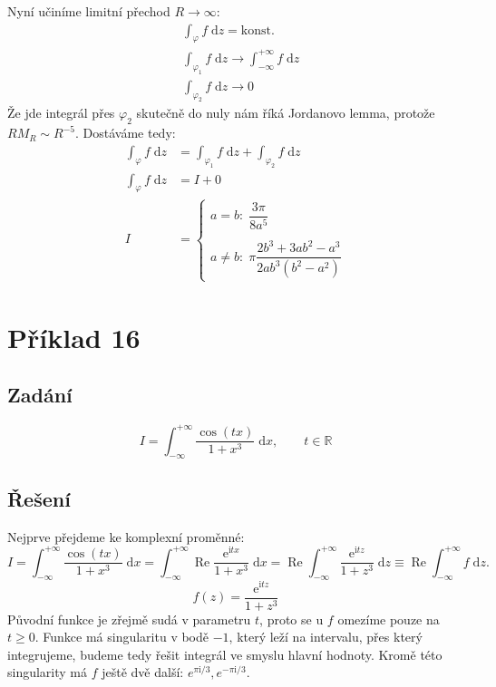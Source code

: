 \documentclass[10pt,a4paper]{article}
\newcommand{\const}[1]{\text{#1}}
\renewcommand{\Re}{\operatorname{Re}}
\renewcommand{\d}[1]{\;\const{d}#1}
\newcommand{\e}[1]{\const{e}^{#1}}
\renewcommand{\i}{\const{i}}
\begin{document}
Nyní učiníme limitní přechod $R \to \infty$:
\begin{align*}
    & \int_\varphi f \d{z} = \const{konst.} \\[5pt]
    & \int_{\varphi_1} f \d{z} \to \int_{-\infty}^{+\infty} f \d{z} \\[5pt]
    & \int_{\varphi_2} f \d{z} \to 0
\end{align*}
Že jde integrál přes $\varphi_2$ skutečně do nuly nám říká Jordanovo lemma, protože $R M_R \sim R^{-5}$. Dostáváme tedy:
\begin{align*}
    \int_\varphi f \d{z} &= \int_{\varphi_1} f \d{z} + \int_{\varphi_2} f \d{z}
    \\[5pt]
    \int_\varphi f \d{z} &= I + 0
    \\[5pt]
    I &= \begin{cases}
        a = b: \; \dfrac{3\pi}{8a^5}
        \\ \\
        a\neq b: \; \pi \dfrac{2b^3 + 3ab^2 - a^3}{2ab^3 (b^2 - a^2)}
    \end{cases}
\end{align*}

\pagebreak

\section{Příklad 16}
\subsection{Zadání}
\begin{equation*}
    I = \int_{-\infty}^{+\infty} \frac{\cos(tx)}{1+x^3} \d{x},
    \hspace{2em}
    t \in \mathbb{R}
\end{equation*}
\subsection{Řešení}
Nejprve přejdeme ke komplexní proměnné:
\begin{equation*}
    I = \int_{-\infty}^{+\infty} \frac{\cos(tx)}{1+x^3} \d{x}
    = \int_{-\infty}^{+\infty} \Re \frac{\e{\i tx}}{1+x^3} \d{x}
    = \Re \int_{-\infty}^{+\infty} \frac{\e{\i tz}}{1+z^3} \d{z}
    \equiv \Re \int_{-\infty}^{+\infty} f \d{z}.
\end{equation*}
\begin{equation*}
    f(z) = \frac{\e{\i tz}}{1+z^3}
\end{equation*}
Původní funkce je zřejmě sudá v parametru $t$, proto se u $f$ omezíme pouze na $t\geq0$. Funkce má singularitu v bodě $-1$, který leží na intervalu, přes který integrujeme, budeme tedy řešit integrál ve smyslu hlavní hodnoty. Kromě této singularity má $f$ ještě dvě další: $e^{\pi\i/3}, e^{-\pi\i/3}$.
\end{document}
